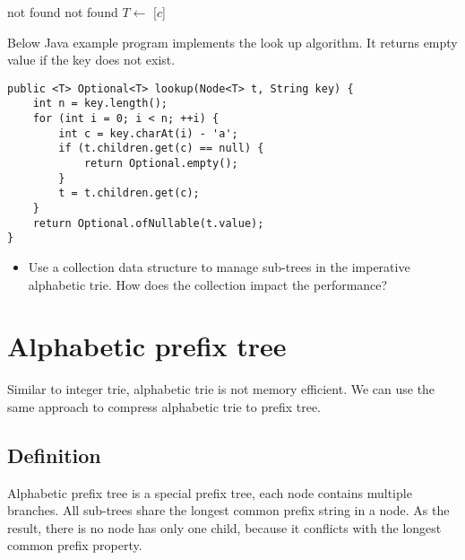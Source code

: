 \documentclass{article}
\begin{document}
\begin{algorithmic}[1]
    \State \Return not found
  \EndIf
      \State \Return not found
    \EndIf
    \State $T \gets $ [$c$]
  \EndFor
  \State \Return {}
\EndFunction
\end{algorithmic}

Below Java example program implements the look up algorithm. It returns empty value if the key does not exist.

\lstset{language=Java}
\begin{lstlisting}
public <T> Optional<T> lookup(Node<T> t, String key) {
    int n = key.length();
    for (int i = 0; i < n; ++i) {
        int c = key.charAt(i) - 'a';
        if (t.children.get(c) == null) {
            return Optional.empty();
        }
        t = t.children.get(c);
    }
    return Optional.ofNullable(t.value);
}
\end{lstlisting}

\begin{Exercise}
\begin{itemize}
\item Use a collection data structure to manage sub-trees in the imperative
alphabetic trie. How does the collection impact the performance?
\end{itemize}
\end{Exercise}

\section{Alphabetic prefix tree}

Similar to integer trie, alphabetic trie is not memory
efficient. We can use the same approach to compress alphabetic trie to
prefix tree.

\subsection{Definition}

Alphabetic prefix tree is a special prefix tree, each node contains
multiple branches. All sub-trees share the longest common
prefix string in a node. As the result, there is no node has only one child,
because it conflicts with the longest common prefix property.
\end{document}
